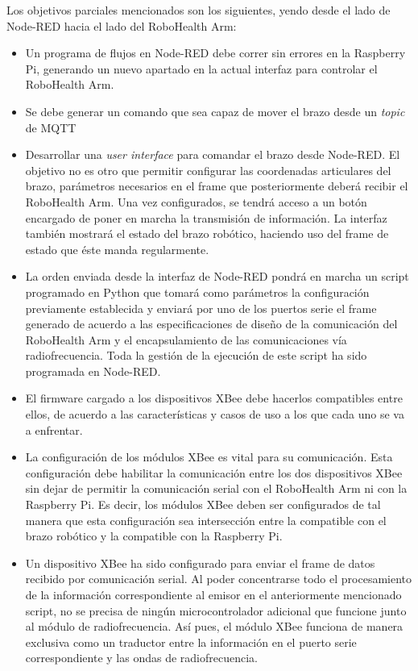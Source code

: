 Los objetivos parciales mencionados son los siguientes, yendo desde el lado de Node-RED hacia el lado del RoboHealth Arm:

\begin{itemize}

\item Un programa de flujos en Node-RED debe correr sin errores en la Raspberry Pi, generando un nuevo apartado en la actual interfaz para controlar el RoboHealth Arm.

\item Se debe generar un comando que sea capaz de mover el brazo desde un \textit{topic} de MQTT

\item Desarrollar una \textit{user interface} para comandar el brazo desde Node-RED. El objetivo no es otro que permitir configurar las coordenadas articulares del brazo, parámetros necesarios en el frame que posteriormente deberá recibir el RoboHealth Arm. Una vez configurados, se tendrá acceso a un botón encargado de poner en marcha la transmisión de información. La interfaz también mostrará el estado del brazo robótico, haciendo uso del frame de estado que éste manda regularmente.

\item La orden enviada desde la interfaz de Node-RED pondrá en marcha un script programado en Python que tomará como parámetros la configuración previamente establecida y enviará por uno de los puertos serie el frame generado de acuerdo a las especificaciones de diseño de la comunicación del RoboHealth Arm y el encapsulamiento de las comunicaciones vía radiofrecuencia. Toda la gestión de la ejecución de este script ha sido programada en Node-RED.

\item El firmware cargado a los dispositivos XBee debe hacerlos compatibles entre ellos, de acuerdo a las características y casos de uso a los que cada uno se va a enfrentar.

\item La configuración de los módulos XBee es vital para su comunicación. Esta configuración debe habilitar la comunicación entre los dos dispositivos XBee sin dejar de permitir la comunicación serial con el RoboHealth Arm ni con la Raspberry Pi. Es decir, los módulos XBee deben ser configurados de tal manera que esta configuración sea intersección entre la compatible con el brazo robótico y la compatible con la Raspberry Pi.

\item Un dispositivo XBee ha sido configurado para enviar el frame de datos recibido por comunicación serial. Al poder concentrarse todo el procesamiento de la información correspondiente al emisor en el anteriormente mencionado script, no se precisa de ningún microcontrolador adicional que funcione junto al módulo de radiofrecuencia. Así pues, el módulo XBee funciona de manera exclusiva como un traductor entre la información en el puerto serie correspondiente y las ondas de radiofrecuencia.


\end{itemize}
